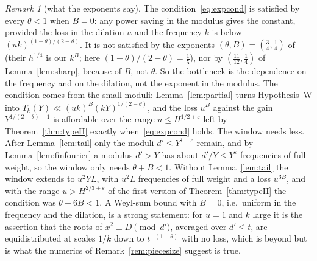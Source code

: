 \documentclass[11pt,a4paper]{article}
\theoremstyle{remark}\newtheorem{remark}[theorem]{Remark}
\begin{document}
\begin{remark}[what the exponents say]\label{rem:exponents}
The condition~\eqref{eq:expcond} is satisfied by every $\theta<1$ when $B=0$: any power saving in the modulus gives the constant,
provided the loss in the dilation $u$ and the frequency $k$ is below $(uk)^{(1-\theta)/(2-\theta)}$. It is not satisfied by
the exponents $(\theta,B)=(\tfrac34,\tfrac14)$ of \cite{DFI2012} (their $h^{1/4}$ is our $k^{B}$; here $(1-\theta)/(2-\theta)=\tfrac15$), nor by
$(\tfrac{11}{12},\tfrac14)$ of Lemma~\ref{lem:sharp}, because of $B$, not $\theta$. So the bottleneck is the dependence on the
frequency and on the dilation, not the exponent in the modulus. The condition comes from the small moduli: Lemma~\ref{lem:partial}
turns Hypothesis~W into $T_k(Y)\ll(uk)^B(kY)^{1/(2-\theta)}$, and the loss $u^B$ against the gain $Y^{1/(2-\theta)-1}$ is affordable
over the range $u\le H^{1/2+\varepsilon}$ left by Theorem~\ref{thm:typeII} exactly when~\eqref{eq:expcond} holds. The window needs less.
After Lemma~\ref{lem:tail} only the moduli $d'\le Y^{1+\varepsilon}$ remain, and by Lemma~\ref{lem:finfourier} a modulus $d'>Y$ has about
$d'/Y\le Y^{\varepsilon}$ frequencies of full weight, so the window only needs $\theta+B<1$. Without Lemma~\ref{lem:tail} the window
extends to $u^2YL$, with $u^2L$ frequencies of full weight and a loss $u^{3B}$, and with the range $u>H^{2/3+\varepsilon}$ of the first
version of Theorem~\ref{thm:typeII} the condition was $\theta+6B<1$.
A Weyl-sum bound with $B=0$, i.e.\ uniform in the frequency and the dilation, is a strong statement: for $u=1$ and
$k$ large it is the assertion that the roots of $x^2\equiv D\pmod{d'}$, averaged over $d'\le t$, are equidistributed at
scales $1/k$ down to $t^{-(1-\theta)}$ with no loss, which is beyond \cite{DFI2012} but is what the numerics of
Remark~\ref{rem:piecesize} suggest is true.
\end{remark}
\end{document}

